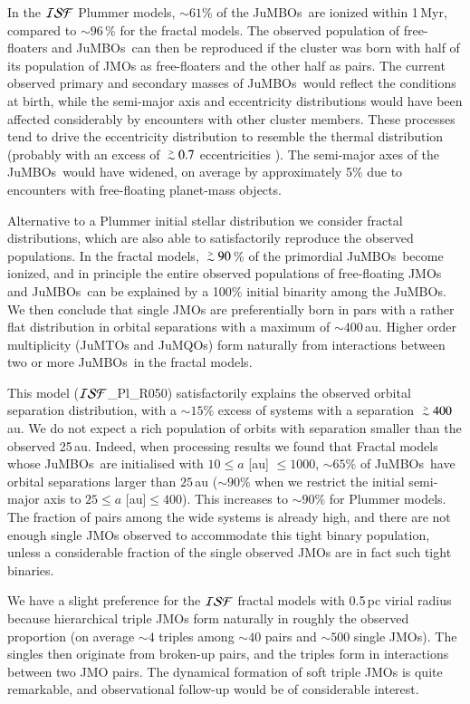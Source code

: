 \documentclass[submission,phys]{lib/SciPost}
\def\apgt{\ {\raise-.5ex\hbox{$\buildrel>\over\sim$}}\ }
\newcommand{\jumbos}{\mbox{JuMBOs}}
\begin{document}
In the ${\cal ISF}$ Plummer models, $\sim 61$\% of the \jumbos\, are
ionized within 1\,Myr, compared to $\sim 96$\,\% for the fractal
models.  The observed population of free-floaters and \jumbos\, can
then be reproduced if the cluster was born with half of its population of JMOs
as free-floaters and the other half as pairs.  The current observed
primary and secondary masses of \jumbos\, would reflect the
conditions at birth, while the semi-major axis and eccentricity
distributions would have been affected considerably by encounters with
other cluster members. These processes tend to drive the eccentricity
distribution to resemble the thermal distribution (probably with an
excess of $\apgt 0.7$ eccentricities
\cite{2000IJoMP...15..4871P}). The semi-major axes of the \jumbos\ would
have widened, on average by approximately 5\% due to encounters with
free-floating planet-mass objects.

Alternative to a Plummer initial stellar distribution we consider
fractal distributions, which are also able to satisfactorily reproduce
the observed populations. In the fractal models, $\apgt 90$\,\% of the
primordial \jumbos\, become ionized, and in principle the entire
observed populations of free-floating JMOs and
\jumbos\, can be explained by a 100\% initial binarity among the
\jumbos. We then conclude that single JMOs are
preferentially born in pars with a rather flat distribution in orbital
separations with a maximum of $\sim 400$\,au.  Higher order
multiplicity (JuMTOs and JuMQOs) form naturally from interactions between
two or more \jumbos\, in the fractal models.

This model (${\cal ISF}$\_Pl\_R050) satisfactorily explains the
observed orbital separation distribution, with a $\sim 15$\% excess of
systems with a separation $\apgt 400$\,au. We do not expect a rich
population of orbits with separation smaller than the observed
25\,au. Indeed, when processing results we found that Fractal models
whose \jumbos\ are initialised with $10\leq a$ [au] $\leq 1000$,
$\sim65\%$ of \jumbos\ have orbital separations larger than $25$\,au
($\sim90\%$ when we restrict the initial semi-major axis to $25\leq a$
[au]$\leq 400$). This increases to $\sim 90\%$ for Plummer models.
The fraction of pairs among the wide systems is already high, and
there are not enough single JMOs observed to accommodate this tight
binary population, unless a considerable fraction of the single
observed JMOs are in fact such tight binaries.

We have a slight preference for the ${\cal ISF}$ fractal models with
0.5\,pc virial radius because hierarchical triple JMOs form naturally
in roughly the observed proportion (on average $\sim 4$ triples among
$\sim 40$ pairs and $\sim 500$ single JMOs). The singles then
originate from broken-up pairs, and the triples form in interactions
between two JMO pairs.  The dynamical formation of soft triple JMOs is
quite remarkable, and observational follow-up would be of considerable
interest.
\end{document}
